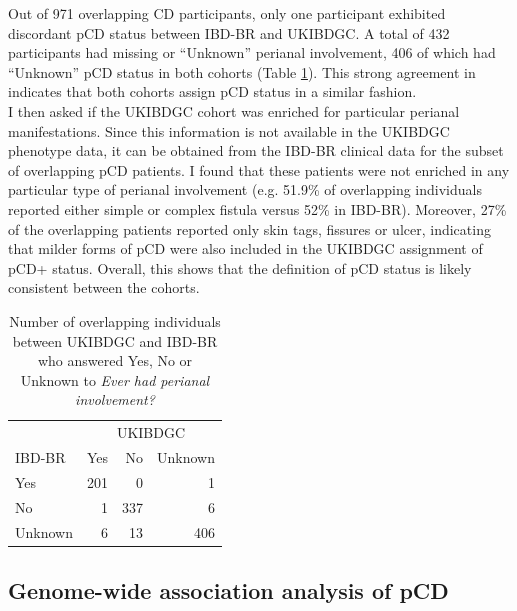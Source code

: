 Out of 971 overlapping CD participants, only one participant exhibited discordant pCD status between IBD-BR and UKIBDGC. A total of 432 participants had missing or “Unknown” perianal involvement, 406 of which had “Unknown” pCD status in both cohorts (Table \ref{table:cohort_pcd_agree}). This strong agreement in indicates that both cohorts assign pCD status in a similar fashion.\\

I then asked if the UKIBDGC cohort was enriched for particular perianal manifestations. Since this information is not available in the UKIBDGC phenotype data, it can be obtained from the IBD-BR clinical data for the subset of overlapping pCD patients. I found that these patients were not enriched in any particular type of perianal involvement (e.g. 51.9\% of overlapping individuals reported either simple or complex fistula versus 52\% in IBD-BR). Moreover, 27\% of the overlapping patients reported only skin tags, fissures or ulcer, indicating that milder forms of pCD were also included in the UKIBDGC assignment of pCD+ status. Overall, this shows that the definition of pCD status is likely consistent between the cohorts.


\begin{table}[htb]
  \caption[Overlapping individuals between UKIBDGC and IBD-BR]{Number of overlapping individuals between UKIBDGC and IBD-BR who answered Yes, No or Unknown to \textit{Ever had perianal involvement?}}
  \label{table:cohort_pcd_agree}
  \centering
  \begin{tabular}[t]{|l|r|r|r|}
  \hline
  \multicolumn{1}{|c|}{ } & \multicolumn{3}{c|}{UKIBDGC} \\
  \cline{2-4}
  IBD-BR& Yes & No & Unknown\\
  \hline
  Yes & 201 & 0 & 1\\
  \hline
  No & 1 & 337 & 6\\
  \hline
  Unknown & 6 & 13 & 406\\
  \hline
  \end{tabular}
  \end{table}

  \subsection{Genome-wide association analysis of pCD}

